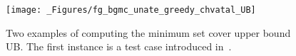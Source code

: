 \begin{figure}[t!]
\vspace*{-2ex}
\centering
\texttt{[image: \_Figures/fg\_bgmc\_unate\_greedy\_chvatal\_UB]}
\caption{
Two examples of computing the minimum set cover upper bound UB.
The first instance is a test case introduced 
in~\cite{OPUS-setc-1979-OR-Chvatal-greedy}.
\vspace*{-2.5ex}
}
\label{fg_bgmc_unate_greedy_chvatal_UB}
\end{figure}
